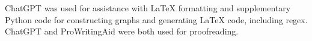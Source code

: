 \label{acknowledgements}

ChatGPT was used for assistance with \LaTeX{} formatting and
supplementary Python code for constructing graphs and generating \LaTeX{} code,
including regex. ChatGPT and ProWritingAid were both used for proofreading.
